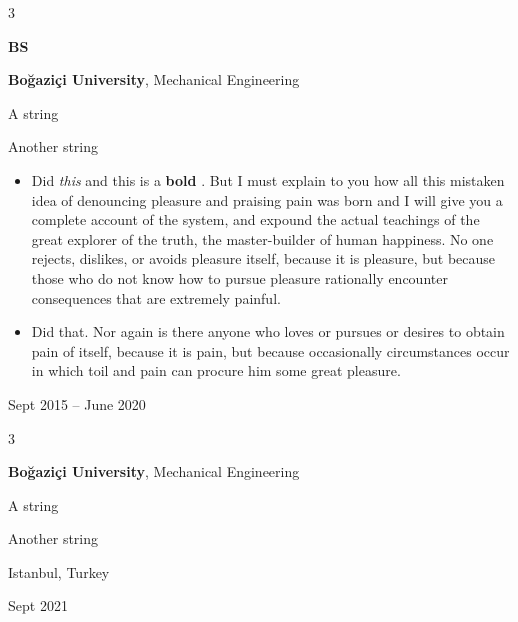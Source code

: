 \documentclass[10pt, letterpaper]{article}
\newenvironment{summary}{
    \begin{description}[
        topsep=0.10 cm,
        parsep=0.10 cm,
        partopsep=0pt,
        itemsep=0pt,
        leftmargin=0.4 cm + 10pt
    ]
}{
    \end{description}
} %
\newenvironment{highlights}{
    \begin{itemize}[
        topsep=0.10 cm,
        parsep=0.10 cm,
        partopsep=0pt,
        itemsep=0pt,
        leftmargin=0.4 cm + 10pt
    ]
}{
    \end{itemize}
} %
\newenvironment{threecolentry}[3][]{
    \onecolentry
    \def\thirdColumn{#3}
    \setcolumnwidth{1 cm, \fill, 4.5 cm}
    \begin{paracol}{3}
    {\raggedright #2} \switchcolumn
}{
    \switchcolumn \raggedleft \thirdColumn
    \end{paracol}
    \endonecolentry
} %
\let\hrefWithoutArrow\href
\renewcommand{\href}[2]{\hrefWithoutArrow{#1}{\ifthenelse{\equal{#2}{}}{ }{#2 }\raisebox{.15ex}{\footnotesize \faExternalLink*}}}
\begin{document}
        \begin{threecolentry}{\textbf{BS}}{
            Sept 2015 – June 2020
        }
            \textbf{Boğaziçi University}, Mechanical Engineering
            \begin{summary}
                \item A string
                \item Another string
            \end{summary}
            \begin{highlights}
                \item Did \textit{this} and this is a \textbf{bold} \href{https://example.com}{link}. But I must explain to you how all this mistaken idea of denouncing pleasure and praising pain was born and I will give you a complete account of the system, and expound the actual teachings of the great explorer of the truth, the master-builder of human happiness. No one rejects, dislikes, or avoids pleasure itself, because it is pleasure, but because those who do not know how to pursue pleasure rationally encounter consequences that are extremely painful.
                \item Did that. Nor again is there anyone who loves or pursues or desires to obtain pain of itself, because it is pain, but because occasionally circumstances occur in which toil and pain can procure him some great pleasure.
            \end{highlights}
        \end{threecolentry}

        \vspace{0.2 cm}

        \begin{threecolentry}{\textbf{}}{
            Istanbul, Turkey

        Sept 2021
        }
            \textbf{Boğaziçi University}, Mechanical Engineering
            \begin{summary}
                \item A string
                \item Another string
            \end{summary}
        \end{threecolentry}

        \vspace{0.2 cm}
\end{document}
